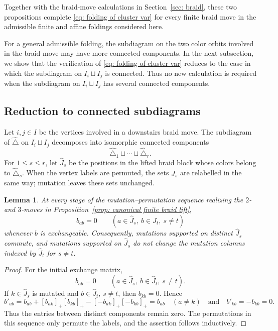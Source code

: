 \documentclass[12pt, leqno]{amsart}
\numberwithin{equation}{section}
\theoremstyle{plain}
\newtheorem{lemma}{Lemma}[section]
\theoremstyle{definition}
\renewcommand{\le}{\leqslant}
\newcommand{\Dynkin}{\triangle}
\newcommand{\hJ}{\widehat{J}}
\newcommand{\hDynkin}{{\widehat{\Dynkin}}}
\newcommand{\qtq}[1][{and}]{\quad\text{{#1}}\quad}
\begin{document}
Together with the  braid-move calculations in Section~\ref{sec: braid}{}, these two
propositions complete \eqref{eq: folding of cluster var} for every
 finite braid move in the admissible finite and affine
foldings considered here.

 For a general admissible folding, the subdiagram on the two
color orbits involved in the braid move may have more connected
components.{}  In the next subsection, we show that the verification of
\eqref{eq: folding of cluster var} reduces to the case in which the
subdiagram on
$I_i\sqcup I_j$
is connected.  Thus no new calculation is required   when the subdiagram on $I_i\sqcup I_j$ has several connected components.

\subsection{\texorpdfstring{  Reduction to connected subdiagrams}{Reduction to connected subdiagrams}}

{}  Let $i,j\in I$
be the vertices involved in a downstairs braid move.  The subdiagram
of $\hDynkin$ on $I_i\sqcup I_j$ decomposes into isomorphic connected
components
\[
\hDynkin_1\sqcup\cdots\sqcup\hDynkin_r.
\]
For $1\le s\le r$, let $\hJ_s$ be the positions in the lifted braid
block whose colors belong to $\hDynkin_s$.
When the vertex labels are permuted, the sets $\hJ_s$ are
relabelled in the same way; mutation leaves these sets unchanged.

\begin{lemma}\label{lem: componentwise braid reduction}
 At every stage of the mutation--permutation sequence realizing the $2$- and $3$-moves in Proposition~\ref{prop: canonical finite braid lift},
\[
b_{ab}=0
\qquad
(a\in\hJ_s,\ b\in\hJ_t,\ s\ne t)
\]
whenever $b$ is exchangeable.
Consequently, mutations supported on distinct $\hJ_s$ commute, and
mutations supported on $\hJ_s$ do not change the mutation columns
 indexed by{} $\hJ_t$ for $s\ne t$.
\end{lemma}

\begin{proof}
 For the initial exchange matrix,
\[
b_{ab}=0
\qquad
(a\in\hJ_s,\ b\in\hJ_t,\ s\ne t).
\]
If $k\in\hJ_s$ is mutated and $b\in\hJ_t$, $s\ne t$, then
$b_{kb}=0$.  Hence
\[
b'_{ab} = b_{ab} +[b_{ak}]_+[b_{kb}]_+ -[-b_{ak}]_+[-b_{kb}]_+ = b_{ab} \quad (a\ne k)
\qtq 
b'_{kb}=-b_{kb}=0.
\]
Thus  the entries between distinct components remain zero.  The permutations in
 this sequence only permute the labels, and the assertion follows
inductively.
\end{proof}
\end{document}
